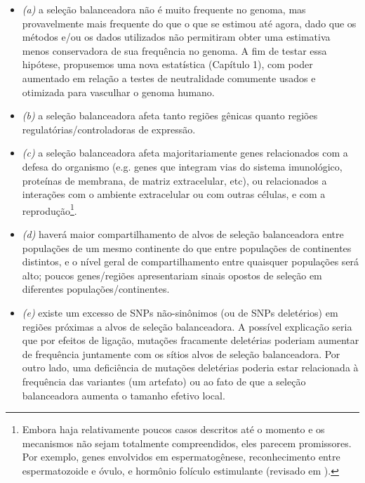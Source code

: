 \begin{refsection}
\begin{itemize}
\item \emph{(a)} a seleção balanceadora não é muito frequente no genoma, mas provavelmente mais frequente do que o que se estimou até agora, dado que os métodos e/ou os dados utilizados não permitiram obter uma estimativa menos conservadora de sua frequência no genoma. A fim de testar essa hipótese, propusemos uma nova estatística (Capítulo 1), com poder aumentado em relação a testes de neutralidade comumente usados e otimizada para vasculhar o genoma humano. 
\item \emph{(b)} a seleção balanceadora afeta tanto regiões gênicas quanto regiões regulatórias/controladoras de expressão. 
\item \emph{(c)} a seleção balanceadora afeta majoritariamente genes relacionados com a defesa do organismo (e.g. genes que integram vias do sistema imunológico, proteínas de membrana, de matriz extracelular, etc), ou relacionados a interações com o ambiente extracelular ou com outras células, e com a reprodução\footnote{Embora haja relativamente poucos casos descritos até o momento e os mecanismos não sejam totalmente compreendidos, eles parecem promissores. Por exemplo, genes envolvidos em espermatogênese, reconhecimento entre espermatozoide e óvulo, e hormônio folículo estimulante (revisado em \cite{VallenderJohnson2008}).}. 
\item \emph{(d)} haverá maior compartilhamento de alvos de seleção balanceadora entre populações de um mesmo continente do que entre populações de continentes distintos, e o nível geral de compartilhamento entre quaisquer populações será alto; poucos genes/regiões apresentariam sinais opostos de seleção em diferentes populações/continentes. 
\item \emph{(e)} existe um excesso de SNPs não-sinônimos (ou de SNPs deletérios) em regiões próximas a alvos de seleção  balanceadora. A possível explicação seria que por efeitos de ligação, mutações fracamente deletérias poderiam aumentar de frequência juntamente com os sítios alvos de seleção balanceadora. Por outro lado, uma deficiência de mutações deletérias poderia estar relacionada à frequência das variantes (um artefato) ou ao fato de que a seleção balanceadora aumenta o tamanho efetivo local.
\end{itemize}


\end{refsection}
